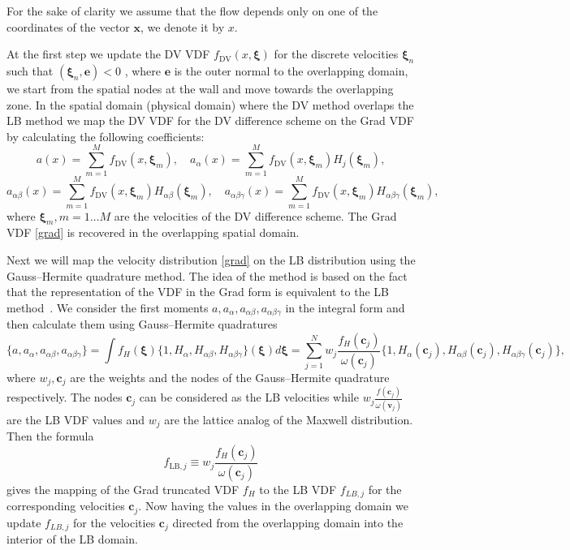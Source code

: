 \documentclass{aip-cp}
\newcommand{\bxi}{\boldsymbol{\xi}}
\newcommand{\bv}{\boldsymbol{v}}
\newcommand{\bc}{\boldsymbol{c}}
\newcommand{\bx}{\boldsymbol{x}}
\begin{document}
For the sake of clarity we assume that the flow depends only on one of the coordinates of the vector $\bx$, we denote it by $x$.

At the first step we update the DV VDF $f_\mathrm{DV}(x,\bxi)$ for the discrete velocities $\bxi_n$ such that $(\bxi_n,\mathbf{e})<0$ , where $\mathbf{e}$ is the outer normal to the overlapping domain, we start from the spatial nodes at the wall and move towards the overlapping zone.
In the spatial domain (physical domain) where the DV method overlaps the LB method we map the DV VDF for the DV difference scheme on the Grad VDF by calculating the following coefficients:
$$
a(x)=\sum_{m=1}^M f_\mathrm{DV}(x,\bxi_m),   \quad a_\alpha(x)=\sum_{m=1}^Mf_\mathrm{DV}(x,\bxi_m)H_j(\bxi_m),
$$
$$
a_{\alpha\beta }(x)=\sum_{m=1}^Mf_\mathrm{DV}(x,\bxi_m)H_{\alpha\beta}(\bxi_m), \quad
a_{\alpha\beta \gamma}(x)=\sum_{m=1}^Mf_\mathrm{DV}(x,\bxi_m)H_{\alpha\beta \gamma}(\bxi_m),
$$
where $\bxi_m, m=1 \ldots M$ are the velocities of the DV difference scheme.
The Grad VDF \eqref{grad} is recovered in the overlapping spatial domain.

Next we will map the velocity distribution \eqref{grad} on the LB distribution using the Gauss--Hermite quadrature method.
The idea of the method is based on the fact that the representation of the VDF in the Grad form
is equivalent to the LB method~\cite{He1997, Shan1998}.
We consider the first moments $a,a_{\alpha},a_{\alpha\beta}, a_{\alpha\beta \gamma}$ in the integral form and then calculate them using Gauss--Hermite quadratures
$$
\{ a,a_{\alpha},a_{\alpha\beta}, a_{\alpha\beta \gamma} \}=\int f_H(\bxi)\{1,H_{\alpha}, H_{\alpha\beta} ,H_{\alpha\beta \gamma}\}(\bxi)d\bxi=\sum_{j=1}^N w_j\frac{f_H(\boldsymbol{c}_j)}{\omega(\bc_j)}
\{1,H_{\alpha}(\bc_j),H_{\alpha\beta}(\bc_j), H_{\alpha\beta\gamma}(\bc_j) \},
$$
where $w_j, \boldsymbol{c}_j$ are the weights and the nodes of the Gauss--Hermite quadrature respectively. The nodes $\bc_j$ can be considered as the LB velocities while $ w_j\frac{f(\bc_j)}{\omega(\bv_j)}$ are the LB VDF values and
$w_j$ are the lattice analog of the Maxwell distribution.  Then the formula
\begin{equation}\label{grad_to_latt}
f_{\mathrm{LB},j}\equiv w_j\frac{f_H(\bc_j)}{\omega(\bc_j)}
\end{equation}
gives the mapping of the Grad truncated VDF $f_H$ to the LB VDF $f_{LB,j}$ for the corresponding velocities $\bc_j$. Now having the values in the overlapping domain we update $f_{LB,j}$ for the velocities $\bc_j$ directed from the overlapping domain into the interior of the LB domain.
\end{document}
